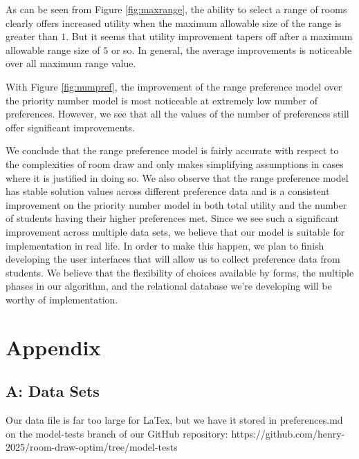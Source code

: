 \documentclass[12pt]{article}
\begin{document}
    As can be seen from Figure \ref{fig:maxrange}, the ability to select a range of rooms clearly offers increased utility when the maximum allowable size of the range is greater than $1$. But it seems that utility improvement tapers off after a maximum allowable range size of $5$ or so. In general, the average improvements is noticeable over all maximum range value.

    With Figure \ref{fig:numpref}, the improvement of the range preference model over the priority number model is most noticeable at extremely low number of preferences. However, we see that all the values of the number of preferences still offer significant improvements. 
    
    We conclude that the range preference model is fairly accurate with respect to the complexities of room draw and only makes simplifying assumptions in cases where it is justified in doing so. We also observe that the range preference model has stable solution values across different preference data and is a consistent improvement on the priority number model in both total utility and the number of students having their higher preferences met.
    Since we see such a significant improvement across multiple data sets, we believe that our model is suitable for implementation in real life. In order to make this happen, we plan to finish developing the user interfaces that will allow us to collect preference data from students. We believe that the flexibility of choices available by forms, the multiple phases in our algorithm, and the relational database we're developing will be worthy of implementation.
    \FloatBarrier
    
    \section*{Appendix}
    \subsection*{A: Data Sets}
        Our data file is far too large for LaTex, but we have it stored in preferences.md on the model-tests branch of our GitHub repository:
        https://github.com/henry-2025/room-draw-optim/tree/model-tests
\end{document}
